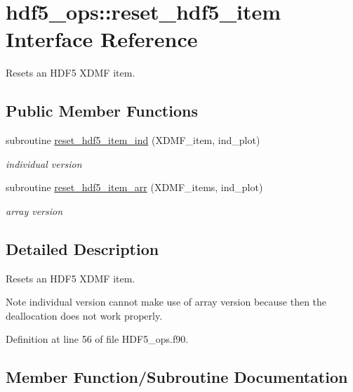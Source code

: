 \hypertarget{interfacehdf5__ops_1_1reset__hdf5__item}{}\section{hdf5\+\_\+ops\+:\+:reset\+\_\+hdf5\+\_\+item Interface Reference}
\label{interfacehdf5__ops_1_1reset__hdf5__item}


Resets an H\+D\+F5 X\+D\+MF item.  


\subsection*{Public Member Functions}
\begin{DoxyCompactItemize}
\item 
subroutine \hyperlink{interfacehdf5__ops_1_1reset__hdf5__item_a6d3555adb7940978c93a259be0ece2c1}{reset\+\_\+hdf5\+\_\+item\+\_\+ind} (X\+D\+M\+F\+\_\+item, ind\+\_\+plot)
\begin{DoxyCompactList}\small\item\em individual version \end{DoxyCompactList}\item 
subroutine \hyperlink{interfacehdf5__ops_1_1reset__hdf5__item_aac823723bdd8de3557acc3fb224ac593}{reset\+\_\+hdf5\+\_\+item\+\_\+arr} (X\+D\+M\+F\+\_\+items, ind\+\_\+plot)
\begin{DoxyCompactList}\small\item\em array version \end{DoxyCompactList}\end{DoxyCompactItemize}


\subsection{Detailed Description}
Resets an H\+D\+F5 X\+D\+MF item. 

\begin{DoxyNote}{Note}
individual version cannot make use of array version because then the deallocation does not work properly. 
\end{DoxyNote}


Definition at line 56 of file H\+D\+F5\+\_\+ops.\+f90.



\subsection{Member Function/\+Subroutine Documentation}
\mbox{\label{interfacehdf5__ops_1_1reset__hdf5__item_aac823723bdd8de3557acc3fb224ac593}} 
